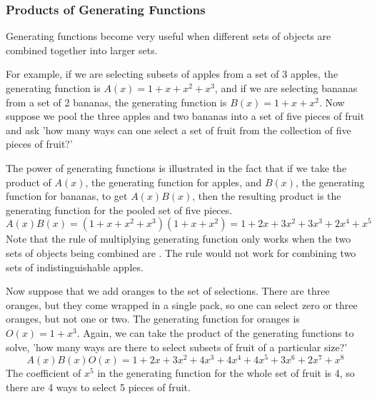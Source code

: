 \subsubsection*{Products of Generating Functions}
Generating functions become very useful when different sets of objects are combined together into larger sets.

For example, if we are selecting subsets of apples from a set of 3 apples, the generating function is $A(x) = 1 + x + x^2 + x^3$, and if we are selecting bananas from a set of 2 bananas, the generating function is $B(x) = 1 + x + x^2$. Now suppose we pool the three apples and two bananas into a set of five pieces of fruit and ask 'how many ways can one select a set of fruit from the collection of five pieces of fruit?'

The power of generating functions is illustrated in the fact that if we take the product of $A(x)$, the generating function for apples, and $B(x)$, the generating function for bananas, to get $A(x)B(x)$, then the resulting product is the generating function for the pooled set of five pieces.
\[
  A(x)B(x) = (1 + x + x^2 + x^3)(1 + x + x^2) = 1 + 2x + 3x^2 + 3x^3 + 2x^4 + x^5
\]
Note that the rule of multiplying generating function only works when the two sets of objects being combined are . The rule would not work for combining two sets of indistinguishable apples.

Now suppose that we add oranges to the set of selections. There are three oranges, but they come wrapped in a single pack, so one can select zero or three oranges, but not one or two. The generating function for oranges is $O(x) = 1 + x^3$. Again, we can take the product of the generating functions to solve, 'how many ways are there to select subsets of fruit of a particular size?'
\[
  A(x)B(x)O(x) = 1 + 2x + 3x^2 + 4x^3 + 4x^4 + 4x^5 + 3x^6 + 2x^7 + x^8
\]
The coefficient of $x^5$ in the generating function for the whole set of fruit is 4, so there are 4 ways to select 5 pieces of fruit.